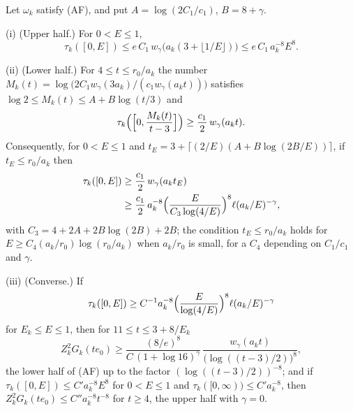 \begin{proposition}\label{rEtwo:spectral}
Let $\omega_k$ satisfy (AF), and put $A=\log(2C_1/c_1)$, $B=8+\gamma$.

\textup{(i)} \textup{(}Upper half.\textup{)} For $0<E\le1$,
\[
\tau_k([0,E])\le e\,C_1\,w_\gamma\bigl(a_k(3+\lfloor1/E\rfloor)\bigr)\le
e\,C_1\,a_k^{-8}E^{8} .
\]

\textup{(ii)} \textup{(}Lower half.\textup{)} For $4\le t\le r_0/a_k$ the
number $M_k(t)=\log\bigl(2C_1w_\gamma(3a_k)/(c_1w_\gamma(a_kt))\bigr)$
satisfies $\log2\le M_k(t)\le A+B\log(t/3)$ and
\[
\tau_k\Bigl(\Bigl[0,\frac{M_k(t)}{t-3}\Bigr]\Bigr)\ge\frac{c_1}2\,w_\gamma(
a_kt).
\]
Consequently, for $0<E\le1$ and $t_E=3+\lceil(2/E)(A+B\log(2B/E))\rceil$,
if $t_E\le r_0/a_k$ then
\begin{align*}
\tau_k([0,E])&\ge\frac{c_1}2\,w_\gamma(a_kt_E)\\
&\ge\frac{c_1}2\,a_k^{-8}\Bigl(\frac{E}{C_3\log(4/E)}\Bigr)^{8}\ell(a_k/E)
^{-\gamma},
\end{align*}
with $C_3=4+2A+2B\log(2B)+2B$; the condition $t_E\le r_0/a_k$ holds for
$E\ge C_4(a_k/r_0)\log(r_0/a_k)$ when $a_k/r_0$ is small, for a $C_4$
depending on $C_1/c_1$ and $\gamma$.

\textup{(iii)} \textup{(}Converse.\textup{)} If
\[
\tau_k([0,E])\ge C^{-1}a_k^{-8}\Bigl(\frac{E}{\log(4/E)}\Bigr)^8
\ell(a_k/E)^{-\gamma}
\]
for $E_k\le E\le1$, then for $11\le t\le3+8/E_k$
\[
Z_k^2G_k(te_0)\ge\frac{(8/e)^8}{C\,(1+\log16)^{\gamma}}\,\frac{w_\gamma(a_kt)}
{\bigl(\log((t-3)/2)\bigr)^8},
\]
the lower half of (AF) up to the factor $(\log((t-3)/2))^{-8}$; and if
$\tau_k([0,E])\le C'a_k^{-8}E^8$ for $0<E\le1$ and $\tau_k([0,\infty))\le
C'a_k^{-8}$, then $Z_k^2G_k(te_0)\le C''a_k^{-8}t^{-8}$ for $t\ge4$, the
upper half with $\gamma=0$.
\end{proposition}

